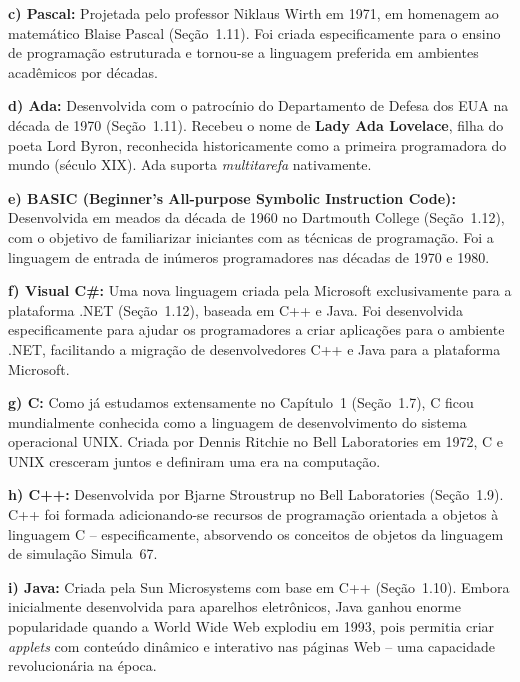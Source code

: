 \documentclass[12pt,a4paper]{article}
\begin{document}
\begin{respostabox}
\medskip
\textbf{c) Pascal:}
Projetada pelo professor Niklaus Wirth em 1971, em homenagem ao matemático Blaise
Pascal (Seção~1.11). Foi criada especificamente para o ensino de programação
estruturada e tornou-se a linguagem preferida em ambientes acadêmicos por décadas.

\medskip
\textbf{d) Ada:}
Desenvolvida com o patrocínio do Departamento de Defesa dos EUA na década de 1970
(Seção~1.11). Recebeu o nome de \textbf{Lady Ada Lovelace}, filha do poeta Lord
Byron, reconhecida historicamente como a primeira programadora do mundo (século XIX).
Ada suporta \textit{multitarefa} nativamente.

\medskip
\textbf{e) BASIC (Beginner's All-purpose Symbolic Instruction Code):}
Desenvolvida em meados da década de 1960 no Dartmouth College (Seção~1.12), com o
objetivo de familiarizar iniciantes com as técnicas de programação. Foi a linguagem
de entrada de inúmeros programadores nas décadas de 1970 e 1980.

\medskip
\textbf{f) Visual C\#:}
Uma nova linguagem criada pela Microsoft exclusivamente para a plataforma .NET
(Seção~1.12), baseada em C++ e Java. Foi desenvolvida especificamente para ajudar
os programadores a criar aplicações para o ambiente .NET, facilitando a migração
de desenvolvedores C++ e Java para a plataforma Microsoft.

\medskip
\textbf{g) C:}
Como já estudamos extensamente no Capítulo~1 (Seção~1.7), C ficou mundialmente
conhecida como a linguagem de desenvolvimento do sistema operacional UNIX. Criada por
Dennis Ritchie no Bell Laboratories em 1972, C e UNIX cresceram juntos e definiram
uma era na computação.

\medskip
\textbf{h) C++:}
Desenvolvida por Bjarne Stroustrup no Bell Laboratories (Seção~1.9). C++ foi
formada adicionando-se recursos de programação orientada a objetos à linguagem C
-- especificamente, absorvendo os conceitos de objetos da linguagem de simulação
Simula~67.

\medskip
\textbf{i) Java:}
Criada pela Sun Microsystems com base em C++ (Seção~1.10). Embora inicialmente
desenvolvida para aparelhos eletrônicos, Java ganhou enorme popularidade quando
a World Wide Web explodiu em 1993, pois permitia criar \textit{applets} com conteúdo
dinâmico e interativo nas páginas Web -- uma capacidade revolucionária na época.

\end{respostabox}

\newpage

\end{document}
